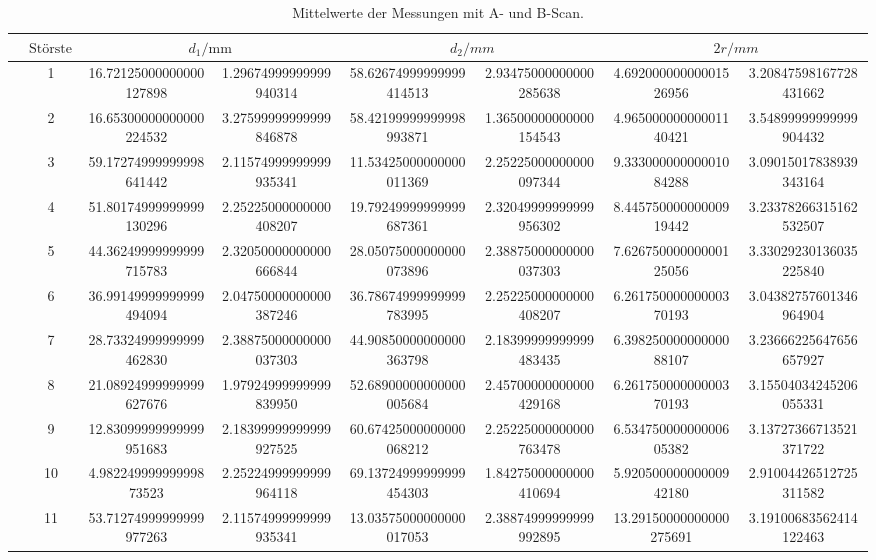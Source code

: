 \begin{table}
        \caption{Mittelwerte der Messungen mit A- und B-Scan.}
        \centering
        \label{tab:diskb}
        \begin{tabular}{l@{}S[round-mode=off, table-format=2.0]S[table-format=2.0, round-precision=0, round-mode=places] @{${}\pm{}$} S[table-format=1.0, round-precision=0, round-mode=places] S[table-format=2.0, round-precision=0, round-mode=places] @{${}\pm{}$} S[table-format=1.0, round-precision=0, round-mode=places] S[table-format=2.0, round-precision=0, round-mode=places] @{${}\pm{}$} S[table-format=1.0, round-precision=0, round-mode=places] } \toprule & {$\text{Störstelle}$}& & & \\\midrule& 1 & 16.72125000000000127898 & 1.29674999999999940314 & 58.62674999999999414513 & 2.93475000000000285638 & 4.69200000000001526956 & 3.20847598167728431662 \\
& 2 & 16.65300000000000224532 & 3.27599999999999846878 & 58.42199999999998993871 & 1.36500000000000154543 & 4.96500000000001140421 & 3.54899999999999904432 \\
& 3 & 59.17274999999998641442 & 2.11574999999999935341 & 11.53425000000000011369 & 2.25225000000000097344 & 9.33300000000001084288 & 3.09015017838939343164 \\
& 4 & 51.80174999999999130296 & 2.25225000000000408207 & 19.79249999999999687361 & 2.32049999999999956302 & 8.44575000000000919442 & 3.23378266315162532507 \\
& 5 & 44.36249999999999715783 & 2.32050000000000666844 & 28.05075000000000073896 & 2.38875000000000037303 & 7.62675000000000125056 & 3.33029230136035225840 \\
& 6 & 36.99149999999999494094 & 2.04750000000000387246 & 36.78674999999999783995 & 2.25225000000000408207 & 6.26175000000000370193 & 3.04382757601346964904 \\
& 7 & 28.73324999999999462830 & 2.38875000000000037303 & 44.90850000000000363798 & 2.18399999999999483435 & 6.39825000000000088107 & 3.23666225647656657927 \\
& 8 & 21.08924999999999627676 & 1.97924999999999839950 & 52.68900000000000005684 & 2.45700000000000429168 & 6.26175000000000370193 & 3.15504034245206055331 \\
& 9 & 12.83099999999999951683 & 2.18399999999999927525 & 60.67425000000000068212 & 2.25225000000000763478 & 6.53475000000000605382 & 3.13727366713521371722 \\
& 10 & 4.98224999999999873523 & 2.25224999999999964118 & 69.13724999999999454303 & 1.84275000000000410694 & 5.92050000000000942180 & 2.91004426512725311582 \\
& 11 & 53.71274999999999977263 & 2.11574999999999935341 & 13.03575000000000017053 & 2.38874999999999992895 & 13.29150000000000275691 & 3.19100683562414122463 \\
 \bottomrule \end{tabular} \end{table}
